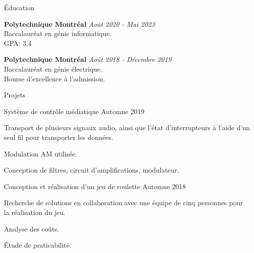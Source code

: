 \documentclass{resume} %
\begin{document}
	
	
	\begin{rSection}{Éducation}
		
		{\bf Polytechnique Montréal} \hfill {\em Août 2020 - Mai 2023} 
		\\ Baccalauréat en génie informatique.
		\\GPA: 3,4
		
		{\bf Polytechnique Montréal} \hfill {\em Août 2018 - Décembre 2019} 
		\\ Baccalauréat en génie électrique.
		\\ \hspace{0.5cm}  Bourse d'excellence à l'admission.
	\end{rSection}
	
	\begin{rSection}{Projets}
		
		\begin{rSubsection}{Système de contrôle médiatique }{Automne 2019}{}{}
			\item   Transport de plusieurs signaux audio, ainsi que l'état d'interrupteurs à l'aide d'un seul fil pour transporter les données.
			\item   Modulation AM utilisée.
			\item Conception de filtres, circuit d'amplifications, modulateur.
			
		\end{rSubsection}
		
%			
		
		\begin{rSubsection}{Conception et réalisation d’un jeu de roulette }{Automne 2018}{}{}
			\item  Recherche de solutions en collaboration avec une équipe de cinq personnes pour la réalisation du jeu.
			\item  Analyse des coûts.
			\item  Étude de praticabilité.
		\end{rSubsection} 
		
	\end{rSection}
	
\end{document}
